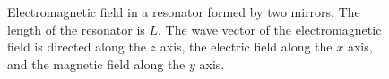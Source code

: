 \begin{figure}
\centering



\caption{Electromagnetic field in a resonator formed by two
   mirrors. The length of the resonator is $L$. The wave vector of the electromagnetic
   field is directed along the $z$ axis, the electric field along the $x$ axis, and
   the magnetic field along the $y$ axis.}
\label{figCh1_Res}
\end{figure}